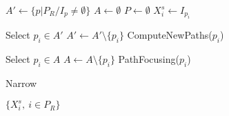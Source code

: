 \STATE $A' \gets \{p | P_R / I_p \neq \emptyset\}$
\STATE $A \gets \emptyset$
\STATE $P \gets \emptyset$ 
	\STATE $X_i^s \gets I_{p_i}$ \label{alg=X-init}
\ENDFOR 
{}

 \label{alg=start-add-paths} 
	\STATE Select $p_i \in A'$
	\STATE $A' \gets A' \setminus \{p_i\}$
	\STATE ComputeNewPaths($p_i$) \label{alg=computeNewPaths}
\ENDWHILE \label{alg=end-add-paths}

\STATE {}
 \label{alg=start-ascending} 
	\STATE Select $p_i \in A$
	\STATE $A \gets A \setminus \{p_i\}$
	\STATE PathFocusing($p_i$) 
	
\ENDWHILE \label{alg=end-ascending}
\STATE Narrow \label{alg=narrowing}
\ENDWHILE

\RETURN $\{X_i^s,\ i \in P_R\}$

